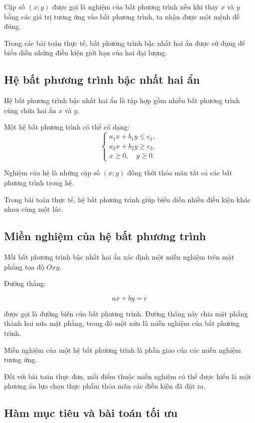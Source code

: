 \documentclass[12pt,a4paper]{article}
\begin{document}
Cặp số $(x;y)$ được gọi là nghiệm của bất phương trình nếu khi thay
$x$ và $y$ bằng các giá trị tương ứng vào bất phương trình, ta nhận được một mệnh đề đúng.

Trong các bài toán thực tế, bất phương trình bậc nhất hai ẩn được sử dụng để biểu diễn những điều kiện giới hạn của hai đại lượng.

\subsection{Hệ bất phương trình bậc nhất hai ẩn}

Hệ bất phương trình bậc nhất hai ẩn là tập hợp gồm nhiều bất phương trình cùng chứa hai ẩn $x$ và $y$.

Một hệ bất phương trình có thể có dạng:
\[
\left\{
\begin{array}{l}
a_1x+b_1y\leq c_1,\\
a_2x+b_2y\geq c_2,\\
x\geq0,\quad y\geq0.
\end{array}
\right.
\]

Nghiệm của hệ là những cặp số $(x;y)$ đồng thời thỏa mãn tất cả các bất phương trình trong hệ.

Trong bài toán thực tế, hệ bất phương trình giúp biểu diễn nhiều điều kiện khác nhau cùng một lúc.

\subsection{Miền nghiệm của hệ bất phương trình}

Mỗi bất phương trình bậc nhất hai ẩn xác định một miền nghiệm trên mặt phẳng tọa độ $Oxy$.

Đường thẳng:

\[
ax+by=c
\]

được gọi là đường biên của bất phương trình. Đường thẳng này chia mặt phẳng thành hai nửa mặt phẳng, trong đó một nửa là miền nghiệm của bất phương trình.

Miền nghiệm của một hệ bất phương trình là phần giao của các miền nghiệm tương ứng.

Đối với bài toán thực đơn, mỗi điểm thuộc miền nghiệm có thể được hiểu là một phương án lựa chọn thực phẩm thỏa mãn các điều kiện đã đặt ra.

\subsection{Hàm mục tiêu và bài toán tối ưu}
\end{document}
